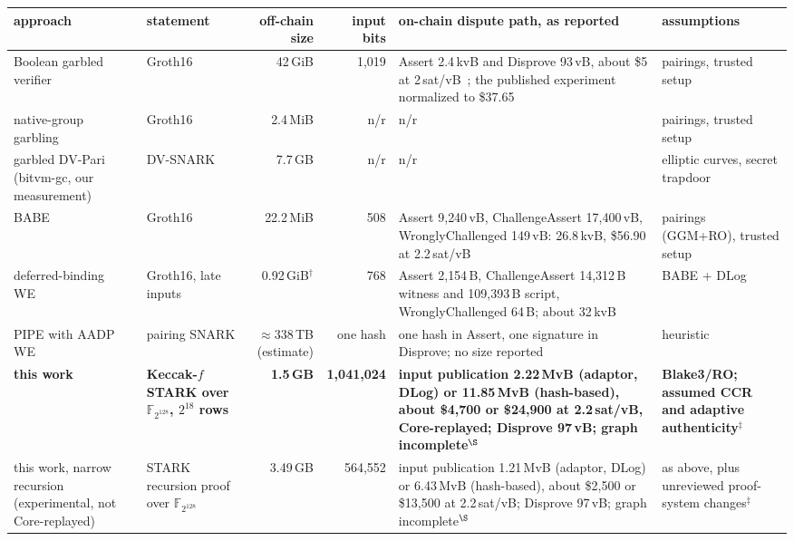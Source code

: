 \documentclass[11pt]{article}
\newcommand{\F}{\mathbb{F}_{2^{128}}}
\begin{document}
\begin{table}[t]\centering\scriptsize\setlength{\tabcolsep}{3pt}
\begin{tabularx}{\textwidth}{>{\raggedright\arraybackslash}p{2.6cm}>{\raggedright\arraybackslash}p{1.7cm}rr>{\raggedright\arraybackslash}X>{\raggedright\arraybackslash}p{2.7cm}}\toprule
approach & statement & off-chain size & input bits & on-chain dispute path, as reported & assumptions\\\midrule
Boolean garbled verifier~\cite{bit25b} & Groth16 & 42\,GiB & 1{,}019 & Assert 2.4\,kvB and Disprove 93\,vB, about \$5 at 2\,sat/vB~\cite{bitvm3paper}; the published experiment normalized to \$37.65~\cite{babe2026} & pairings, trusted setup\\
native-group garbling~\cite{kflt26native} & Groth16 & 2.4\,MiB & n/r & n/r & pairings, trusted setup\\\addlinespace[2pt]
garbled DV-Pari (bitvm-gc, our measurement) & DV-SNARK & 7.7\,GB & n/r & n/r & elliptic curves, secret trapdoor\\\addlinespace[2pt]
BABE~\cite{babe2026} & Groth16 & 22.2\,MiB & 508 & Assert 9{,}240\,vB, ChallengeAssert 17{,}400\,vB, WronglyChallenged 149\,vB: 26.8\,kvB, \$56.90 at 2.2\,sat/vB & pairings (GGM+RO), trusted setup\\\addlinespace[2pt]
deferred-binding WE~\cite{goatpbwe} & Groth16, late inputs & 0.92\,GiB$^{\dagger}$ & 768 & Assert 2{,}154\,B, ChallengeAssert 14{,}312\,B witness and 109{,}393\,B script, WronglyChallenged 64\,B; about 32\,kvB & BABE + DLog\\\addlinespace[2pt]
PIPE with AADP WE~\cite{pipesv2,aadp2026} & pairing SNARK & $\approx338$\,TB (estimate) & one hash & one hash in Assert, one signature in Disprove; no size reported & heuristic\\\addlinespace[2pt]
\textbf{this work} & \textbf{Keccak-$f$ STARK over $\F$, $2^{18}$ rows} & \textbf{1.5\,GB} & \textbf{1{,}041{,}024} & \textbf{input publication 2.22\,MvB (adaptor, DLog) or 11.85\,MvB (hash-based), about \$4{,}700 or \$24{,}900 at 2.2\,sat/vB, Core-replayed; Disprove 97\,vB; graph incomplete}$^{\S}$ & \textbf{Blake3/RO; assumed CCR and adaptive authenticity}$^{\ddagger}$\\\addlinespace[2pt]
this work, narrow recursion (experimental, not Core-replayed) & STARK recursion proof over $\F$ & 3.49\,GB & 564{,}552 & input publication 1.21\,MvB (adaptor, DLog) or 6.43\,MvB (hash-based), about \$2{,}500 or \$13{,}500 at 2.2\,sat/vB; Disprove 97\,vB; graph incomplete$^{\S}$ & as above, plus unreviewed proof-system changes$^{\ddagger}$\\\bottomrule

\end{tabularx}
\end{table}
\end{document}
